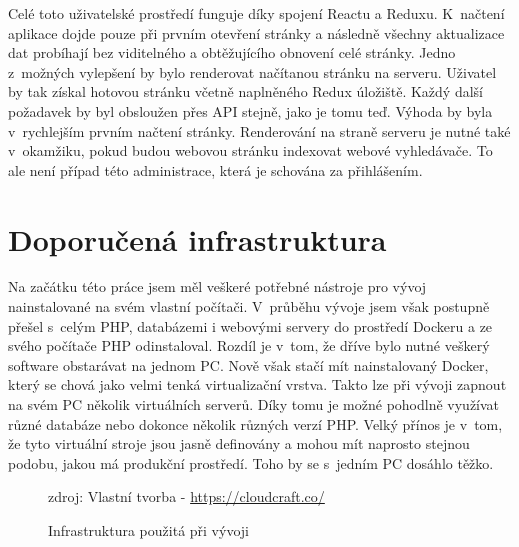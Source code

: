 Celé toto uživatelské prostředí funguje díky spojení Reactu a Reduxu. K~načtení aplikace dojde pouze při prvním otevření stránky a následně všechny aktualizace dat probíhají bez viditelného a obtěžujícího obnovení celé strán\-ky. Jedno z~možných vylepšení by bylo renderovat načítanou stránku na serveru. Uživatel by tak získal hotovou stránku včetně naplněného Redux úložiště. Každý další požadavek by byl obsloužen přes API stejně, jako je tomu teď. Výhoda by byla v~rychlejším prvním načtení stránky. Renderování na straně serveru je nutné také v~okamžiku, pokud budou webovou stránku indexovat webové vyhledávače. To ale není případ této administrace, která je schována za přihlášením.


\section{Doporučená infrastruktura}
Na začátku této práce jsem měl veškeré potřebné nástroje pro vývoj nainstalované na svém vlastní počítači. V~průběhu vývoje jsem však postupně přešel s~celým PHP, databázemi i webovými servery do prostředí Dockeru \cite{docker} a ze svého počítače PHP odinstaloval. Rozdíl je v~tom, že dříve bylo nutné veškerý software obstarávat na jednom PC. Nově však stačí mít nainstalovaný Docker, který se chová jako velmi tenká virtualizační vrstva. Takto lze při vývoji zapnout na svém PC několik virtuálních serverů. Díky tomu je možné pohodlně využívat různé databáze nebo dokonce několik různých verzí PHP. Velký přínos je v~tom, že tyto virtuální stroje jsou jasně definovány a mohou mít naprosto stejnou podobu, jakou má produkční prostředí. Toho by se s~jedním PC dosáhlo těžko.

\begin{figure}[h]
	\centering
	\caption{Infrastruktura použitá při vývoji}
	\small zdroj: Vlastní tvorba - \url{https://cloudcraft.co/}
	\label{fig:infrastructureDevelopment}
\end{figure}

